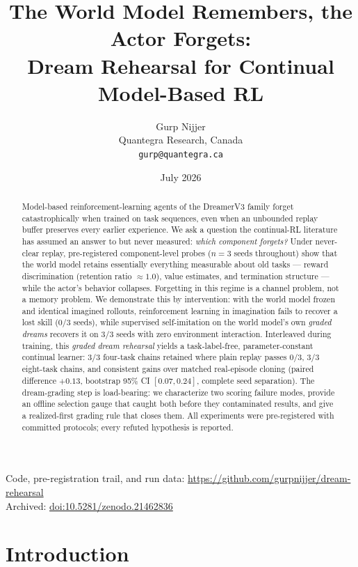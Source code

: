 \documentclass[10pt]{article}
\title{\bfseries The World Model Remembers, the Actor Forgets:\\
Dream Rehearsal for Continual Model-Based RL}
\author{Gurp Nijjer\\ Quantegra Research, Canada\\ \small\texttt{gurp@quantegra.ca}}
\date{July 2026}
\begin{document}
\maketitle

\begin{abstract}
Model-based reinforcement-learning agents of the DreamerV3 family forget catastrophically when
trained on task sequences, even when an unbounded replay buffer preserves every earlier
experience. We ask a question the continual-RL literature has assumed an answer to but never
measured: \emph{which component forgets?} Under never-clear replay, pre-registered
component-level probes ($n{=}3$ seeds throughout) show that the world model retains
essentially everything measurable about old tasks --- reward discrimination (retention ratio
$\approx 1.0$), value estimates, and termination structure --- while the actor's behavior
collapses. Forgetting in this regime is a channel problem, not a memory problem. We
demonstrate this by intervention: with the world model frozen and identical imagined rollouts,
reinforcement learning in imagination fails to recover a lost skill (0/3 seeds), while
supervised self-imitation on the world model's own \emph{graded dreams} recovers it on 3/3
seeds with zero environment interaction. Interleaved during training, this \emph{graded dream
rehearsal} yields a task-label-free, parameter-constant continual learner: 3/3 four-task
chains retained where plain replay passes 0/3, 3/3 eight-task chains, and consistent gains
over matched real-episode cloning (paired difference $+0.13$, bootstrap 95\% CI
$[0.07, 0.24]$, complete seed separation). The dream-grading step is load-bearing: we
characterize two scoring failure modes, provide an offline selection gauge that caught both
before they contaminated results, and give a realized-first grading rule that closes them.
All experiments were pre-registered with committed protocols; every refuted hypothesis is
reported.
\end{abstract}

\vspace{0.4em}
\noindent Code, pre-registration trail, and run data:
\url{https://github.com/gurpnijjer/dream-rehearsal}\\
Archived: \href{https://doi.org/10.5281/zenodo.21462836}{doi:10.5281/zenodo.21462836}

\section{Introduction}
\end{document}
